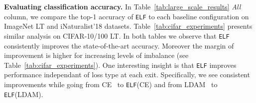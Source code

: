 \documentclass{article}
\newcommand{\method}{\texttt{ELF}\xspace}
\begin{document}
\textbf{Evaluating classification accuracy.}
In Table~\ref{tab:large_scale_results} \textit{All} column, we compare the top-1 accuracy of \method{} to each baseline configuration on ImageNet LT and iNaturalist'18 datasets.
Table~\ref{tab:cifar_experiments} presents similar analysis on CIFAR-10/100 LT. 
In both tables we observe that \method{} consistently improves the state-of-the-art accuracy. 
Moreover the margin of improvement is higher for increasing levels of imbalance (see Table~\ref{tab:cifar_experiments}). 
One interesting insight is that \method{} improves performance independant of loss type at each exit.
Specifically, we see consistent improvements while going from CE~\cite{cui2019class} to \method{}{\scriptsize (CE)} and from LDAM~\cite{cao2019learning} to \method{}{\scriptsize (LDAM)}.
\end{document}

